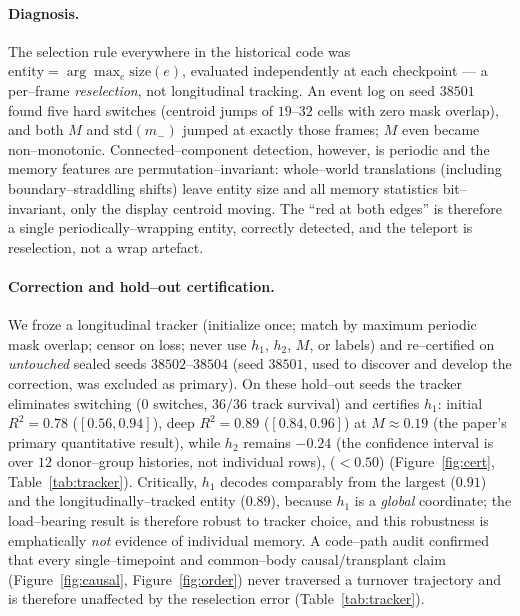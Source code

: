 \documentclass[11pt]{article}
\begin{document}
\paragraph{Diagnosis.} The selection rule everywhere in the historical code was
$\text{entity}=\arg\max_e \text{size}(e)$, evaluated independently at each checkpoint --- a per--frame
\emph{reselection}, not longitudinal tracking. An event log on seed $38501$ found five hard switches (centroid jumps
of $19$--$32$ cells with zero mask overlap), and both $M$ and $\mathrm{std}(m_-)$ jumped at exactly those frames;
$M$ even became non--monotonic. Connected--component detection, however, is periodic and the memory features are
permutation--invariant: whole--world translations (including boundary--straddling shifts) leave entity size and all
memory statistics bit--invariant, only the display centroid moving. The ``red at both edges'' is therefore a single
periodically--wrapping entity, correctly detected, and the teleport is reselection, not a wrap artefact.

\paragraph{Correction and hold--out certification.} We froze a longitudinal tracker (initialize once; match by
maximum periodic mask overlap; censor on loss; never use $h_1$, $h_2$, $M$, or labels) and re--certified on
\emph{untouched} sealed seeds $38502$--$38504$ (seed $38501$, used to discover and develop the correction, was
excluded as primary). On these hold--out seeds the tracker eliminates switching ($0$ switches, $36/36$ track
survival) and certifies $h_1$: initial $R^2=0.78$ ($[0.56,0.94]$), deep $R^2=0.89$ ($[0.84,0.96]$) at $M\approx0.19$ (the paper's primary quantitative result),
while $h_2$ remains $-0.24$ (the confidence interval is over $12$ donor--group histories, not individual rows), ($<0.50$) (Figure~\ref{fig:cert}, Table~\ref{tab:tracker}). Critically, $h_1$ decodes comparably from the largest ($0.91$) and the longitudinally--tracked entity ($0.89$),
because $h_1$ is a \emph{global} coordinate; the load--bearing result is therefore robust to tracker choice, and
this robustness is emphatically \emph{not} evidence of individual memory. A code--path audit confirmed that every
single--timepoint and common--body causal/transplant claim (Figure~\ref{fig:causal}, Figure~\ref{fig:order}) never
traversed a turnover trajectory and is therefore unaffected by the reselection error (Table~\ref{tab:tracker}).
\end{document}
